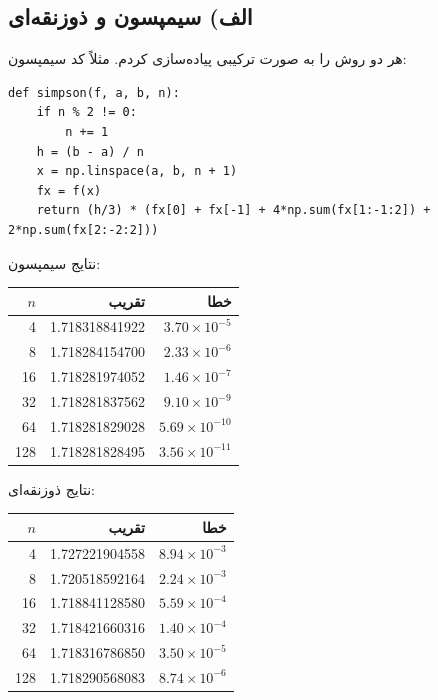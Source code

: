 \documentclass[12pt,a4paper]{article}
\begin{document}
\subsection{الف) سیمپسون و ذوزنقه‌ای}

هر دو روش را به صورت ترکیبی پیاده‌سازی کردم. مثلاً کد سیمپسون:

\begin{latin}
\begin{lstlisting}
def simpson(f, a, b, n):
    if n % 2 != 0:
        n += 1
    h = (b - a) / n
    x = np.linspace(a, b, n + 1)
    fx = f(x)
    return (h/3) * (fx[0] + fx[-1] + 4*np.sum(fx[1:-1:2]) + 2*np.sum(fx[2:-2:2]))
\end{lstlisting}
\end{latin}

نتایج سیمپسون:

\begin{table}[H]
\centering
\begin{tabular}{rrr}
\toprule
$n$ & تقریب & خطا \\
\midrule
4 & 1.718318841922 & $3.70 \times 10^{-5}$ \\
8 & 1.718284154700 & $2.33 \times 10^{-6}$ \\
16 & 1.718281974052 & $1.46 \times 10^{-7}$ \\
32 & 1.718281837562 & $9.10 \times 10^{-9}$ \\
64 & 1.718281829028 & $5.69 \times 10^{-10}$ \\
128 & 1.718281828495 & $3.56 \times 10^{-11}$ \\
\bottomrule
\end{tabular}
\end{table}

نتایج ذوزنقه‌ای:

\begin{table}[H]
\centering
\begin{tabular}{rrr}
\toprule
$n$ & تقریب & خطا \\
\midrule
4 & 1.727221904558 & $8.94 \times 10^{-3}$ \\
8 & 1.720518592164 & $2.24 \times 10^{-3}$ \\
16 & 1.718841128580 & $5.59 \times 10^{-4}$ \\
32 & 1.718421660316 & $1.40 \times 10^{-4}$ \\
64 & 1.718316786850 & $3.50 \times 10^{-5}$ \\
128 & 1.718290568083 & $8.74 \times 10^{-6}$ \\
\bottomrule
\end{tabular}
\end{table}
\end{document}
